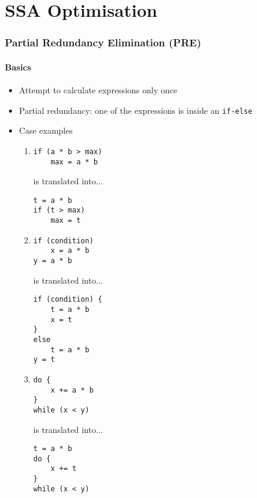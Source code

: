 \documentclass[a4paper,12pt, notitlepage]{article}
\begin{document}
\section*{SSA Optimisation}
\subsubsection*{Partial Redundancy Elimination (PRE)}
\paragraph*{Basics}
\begin{itemize}
\item Attempt to calculate expressions only once
\item Partial redundancy: one of the expressions is inside an \texttt{if-else}
\pagebreak
\item Case examples
    \begin{enumerate}
        \item 
        \begin{verbatim}
if (a * b > max)
    max = a * b
        \end{verbatim} \vspace{-0.5cm}
        is translated into...
        \begin{verbatim}
t = a * b
if (t > max)
    max = t
        \end{verbatim} \vspace{-0.5cm}
        \item 
        \begin{verbatim}
if (condition)
    x = a * b
y = a * b
        \end{verbatim} \vspace{-0.5cm}
        is translated into...
        \begin{verbatim}
if (condition) {
    t = a * b
    x = t
}
else
    t = a * b
y = t
        \end{verbatim} \vspace{-0.5cm}
        \item 
        \begin{verbatim}
do {
    x += a * b
}
while (x < y)
        \end{verbatim} \vspace{-0.5cm}
        is translated into...
        \begin{verbatim}
t = a * b
do {
    x += t
}
while (x < y)
        \end{verbatim} \vspace{-0.5cm}
        \pagebreak

\end{enumerate}
\end{itemize}
\end{document}
